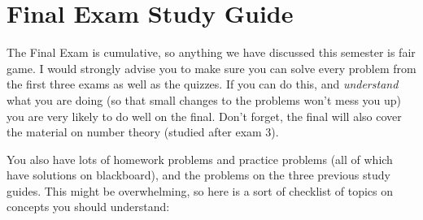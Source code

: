 \section{Final Exam Study Guide}

The Final Exam is cumulative, so anything we have discussed this semester is fair game.  I would strongly advise you to make sure you can solve every problem from the first three exams as well as the quizzes.  If you can do this, and {\em understand} what you are doing (so that small changes to the problems won't mess you up) you are very likely to do well on the final.  Don't forget, the final will also cover the material on number theory (studied after exam 3).

You also have lots of homework problems and practice problems (all of which have solutions on blackboard), and the problems on the three previous study guides.  This might be overwhelming, so here is a sort of checklist of topics on concepts you should understand:

